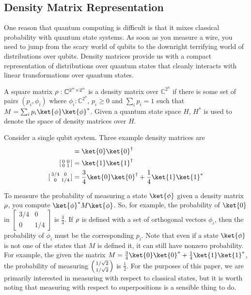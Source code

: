 \subsection{Density Matrix Representation}%
One reason that quantum computing is difficult is that it mixes classical probability with quantum state systems.
As soon as you measure a wire, you need to jump from the scary world of qubits to the downright terrifying world of distributions over qubits.
Density matrices provide us with a compact representation of distributions over quantum states that cleanly interacts with linear transformations over quantum states.
\begin{definition}
A square matrix $\rho : \mathbb{C}^{2^n\times 2^n}$ is a density matrix over $\mathbb{C}^{2^n}$ if there is some set of pairs $(p_i,\phi_i)$ where $\phi_i: \mathbb{C}^{2^n}$, $p_i\geq 0$ and $\sum_{i}p_i=1$ such that
$M=\sum_{i}p_i\ket{\phi}\ket{\phi}^*$. Given a quantum state space $H$, $H^*$ is used to denote the space of density matrices over $H$.
\end{definition}
Consider a single qubit system. Three example density matrices are
\begin{align}
[\begin{smallmatrix} 1 & 0 \\ 0 & 0 \end{smallmatrix}]&= \ket{0}\ket{0}^\dagger\\
 [\begin{smallmatrix} 0 & 0 \\ 0 & 1 \end{smallmatrix}]&= \ket{1}\ket{1}^\dagger\\
 [\begin{smallmatrix} 3/4 & 0 \\ 0 & 1/4 \end{smallmatrix}]&= \frac{3}{4}\ket{0}\ket{0}^\dagger + \frac{1}{4}\ket{1}\ket{1}^*
\end{align}

To measure the probability of measuring a state $\ket{\phi}$ given a density matrix $\rho$, you compute $\ket{\phi}^*M\ket{\phi}$.
So, for example, the probability of $\ket{0}$ in $[\begin{smallmatrix} 3/4 & 0 \\ 0 & 1/4 \end{smallmatrix}]$ is $\frac{3}{4}$.
If $\rho$ is defined with a set of orthogonal vectors $\phi_i$, then the probability of $\phi_i$ must be the corresponding $p_i$.
Note that even if a state $\ket{\phi}$ is not one of the states that $M$ is defined it, it can still have nonzero probability.
For example, the given the matrix $M = \frac{3}{4}\ket{0}\ket{0}^* + \frac{1}{4}\ket{1}\ket{1}^*$, the probability of measuring $\left(\begin{smallmatrix}1 / \sqrt{2} \\ 1 / \sqrt{2}\end{smallmatrix}\right)$ is $\frac{1}{2}$.
For the purposes of this paper, we are primarily interested in measuring with respect to classical states, but it is worth noting that measuring with respect to superpositions is a sensible thing to do.

